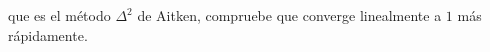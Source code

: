 \documentclass[
	spanish,
	8pt,
	utf8,
	xcolor=table,
	handout,
	aspectratio=169,
	professionalfonts,
	notheorems,
	mathserif,
]{beamer}
\newcounter{savedenum}
\newcommand*{\saveenum}{\setcounter{savedenum}{\theenumi}}
\begin{document}
\begin{frame}
\begin{enumerate}
		      que es el método $\Delta^{2}$ de Aitken,
		      compruebe que converge linealmente a $1$ más rápidamente.


		      \saveenum
	\end{enumerate}
\end{frame}
\end{document}
